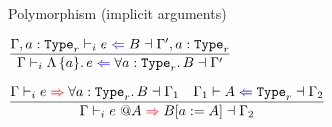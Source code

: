\begin{frame}{Polymorphism (implicit arguments)}

\begin{center}
  $\infrule{\checktype{\extendtype{\Gamma}{a}[r]}{e}{B}{\extendtype{\Gamma'}{a}[r]}}{\checktype{\Gamma}{\itfun{a}{e}}{\ForallI{a}[r]{B}}{\Gamma'}}$

  \vspace{2em}

  $\infrule{\infertype{\Gamma}{e}{\ForallI{a}[r]{B}}{\Gamma_1} \quad \checkkind{\Gamma_1}{A}[r]{\Gamma_2}}{\infertype{\Gamma}{\itapp{e}{A}}{\subst{B}{a}{A}}{\Gamma_2}}$
\end{center}

\end{frame}